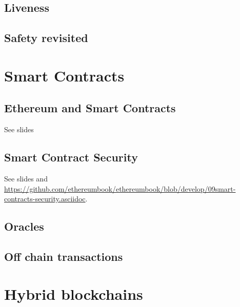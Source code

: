 \documentclass[a4paper,11pt,draft]{report}
\begin{document}
	\section{Liveness}
	\label{sec:live}
	
	
	\section{Safety revisited}
	\label{sec:safe2}
	
	
\chapter{Smart Contracts}

	\section{Ethereum and Smart Contracts}
	See slides 

	\section{Smart Contract Security}
	See slides and \url{https://github.com/ethereumbook/ethereumbook/blob/develop/09smart-contracts-security.asciidoc}.
	
	\section{Oracles}
	
	\section{Off chain transactions}

\chapter{Hybrid blockchains}
	\label{ch:hybrid}
	
\end{document}
